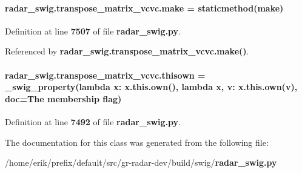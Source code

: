 \paragraph[{make}]{\setlength{\rightskip}{0pt plus 5cm}radar\+\_\+swig.\+transpose\+\_\+matrix\+\_\+vcvc.\+make = staticmethod(make)\hspace{0.3cm}{\ttfamily [static]}}\label{classradar__swig_1_1transpose__matrix__vcvc_a2f7c12e00d4dd16814f4f26c51bd781c}


Definition at line {\bf 7507} of file {\bf radar\+\_\+swig.\+py}.



Referenced by {\bf radar\+\_\+swig.\+transpose\+\_\+matrix\+\_\+vcvc.\+make()}.

\paragraph[{thisown}]{\setlength{\rightskip}{0pt plus 5cm}radar\+\_\+swig.\+transpose\+\_\+matrix\+\_\+vcvc.\+thisown = {\bf \+\_\+swig\+\_\+property}(lambda x\+: x.\+this.\+own(), lambda {\bf x}, v\+: x.\+this.\+own(v), doc=\textquotesingle{}The membership flag\textquotesingle{})\hspace{0.3cm}{\ttfamily [static]}}\label{classradar__swig_1_1transpose__matrix__vcvc_a8693bf9d5a05d9cca3d79eb07fd93b43}


Definition at line {\bf 7492} of file {\bf radar\+\_\+swig.\+py}.



The documentation for this class was generated from the following file\+:\begin{DoxyCompactItemize}
\item 
/home/erik/prefix/default/src/gr-\/radar-\/dev/build/swig/{\bf radar\+\_\+swig.\+py}\end{DoxyCompactItemize}
